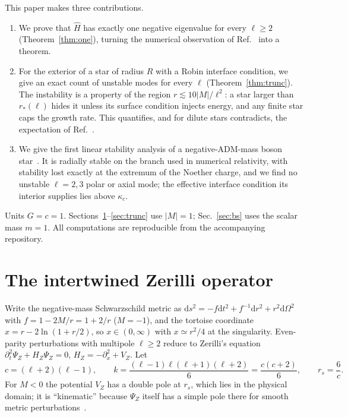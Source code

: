 \documentclass[11pt]{article}
\theoremstyle{remark}
\newcommand{\Hhat}{\hat{H}}
\newcommand{\dd}{\mathrm{d}}
\begin{document}
This paper makes three contributions.
\begin{enumerate}
\item We prove that $\Hhat$ has exactly one negative eigenvalue for every $\ell\ge2$ (Theorem~\ref{thm:one}), turning
the numerical observation of Ref.~\cite{DG2009} into a theorem.
\item For the exterior of a star of radius $R$ with a Robin interface condition, we give an exact count of unstable modes
for every $\ell$ (Theorem~\ref{thm:trunc}). The instability is a property of the region $r\lesssim 10|M|/\ell^2$: a star
larger than $r_*(\ell)$ hides it unless its surface condition injects energy, and any finite star caps the growth rate.
This quantifies, and for dilute stars contradicts, the expectation of Ref.~\cite{Dotti2022}.
\item We give the first linear stability analysis of a negative-ADM-mass boson star~\cite{Shirokov2026}. It is radially
stable on the branch used in numerical relativity, with stability lost exactly at the extremum of the Noether charge,
and we find no unstable $\ell=2,3$ polar or axial mode; the effective interface condition its interior supplies lies
above $\kappa_c$.
\end{enumerate}

Units $G=c=1$. Sections~\ref{sec:op}--\ref{sec:trunc} use $|M|=1$; Sec.~\ref{sec:bs} uses the scalar mass $m=1$.
All computations are reproducible from the accompanying repository.

\section{The intertwined Zerilli operator}\label{sec:op}

Write the negative-mass Schwarzschild metric as $\dd s^2=-f\dd t^2+f^{-1}\dd r^2+r^2\dd\Omega^2$ with
$f=1-2M/r=1+2/r$ ($M=-1$), and the tortoise coordinate $x=r-2\ln(1+r/2)$, so $x\in(0,\infty)$ with $x\simeq r^2/4$ at
the singularity. Even-parity perturbations with multipole $\ell\ge2$ reduce to Zerilli's equation~\cite{Zerilli1970}
$\partial_t^2\Psi_Z+H_Z\Psi_Z=0$, $H_Z=-\partial_x^2+V_Z$. Let
\begin{equation}
c=(\ell+2)(\ell-1),\qquad k=\frac{(\ell-1)\ell(\ell+1)(\ell+2)}{6}=\frac{c(c+2)}{6},\qquad r_s=\frac{6}{c}.
\end{equation}
For $M<0$ the potential $V_Z$ has a double pole at $r_s$, which lies in the physical domain; it is ``kinematic'' because
$\Psi_Z$ itself has a simple pole there for smooth metric perturbations~\cite{GD2006}.
\end{document}
